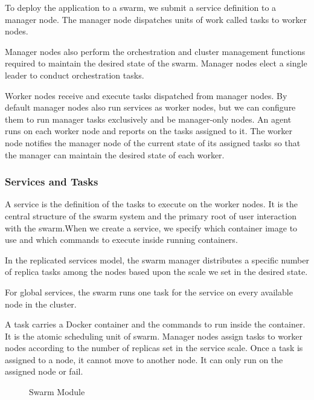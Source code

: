 \documentclass[9pt,twocolumn,twoside]{../../styles/osajnl}
\begin{document}
To deploy the application to a swarm, we submit a service definition to a manager node. The manager node dispatches units of work called tasks to worker nodes.

Manager nodes also perform the orchestration and cluster management functions required to maintain the desired state of the swarm. Manager nodes elect a single leader to conduct orchestration tasks.

Worker nodes receive and execute tasks dispatched from manager nodes. By default manager nodes also run services as worker nodes, but we can configure them to run manager tasks exclusively and be manager-only nodes. An agent runs on each worker node and reports on the tasks assigned to it. The worker node notifies the manager node of the current state of its assigned tasks so that the manager can maintain the desired state of each worker.


\subsubsection{Services and Tasks}

A service is the definition of the tasks to execute on the worker nodes. It is the central structure of the swarm system and the primary root of user interaction with the swarm.When we create a service, we specify which container image to use and which commands to execute inside running containers.

In the replicated services model, the swarm manager distributes a specific number of replica tasks among the nodes based upon the scale we set in the desired state.

For global services, the swarm runs one task for the service on every available node in the cluster.

A task carries a Docker container and the commands to run inside the container. It is the atomic scheduling unit of swarm. Manager nodes assign tasks to worker nodes according to the number of replicas set in the service scale. Once a task is assigned to a node, it cannot move to another node. It can only run on the assigned node or fail.


\begin{figure}[h!]
\centering
{}
\caption{Swarm Module }
\label{fig:cmsswarm}
\end{figure}
\end{document}

